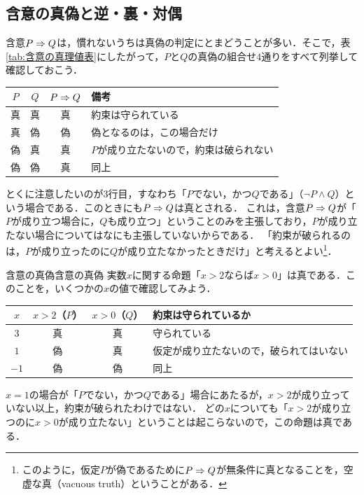 \subsection{含意の真偽と逆・裏・対偶}

含意$P \mathrel{\Rightarrow} Q$は，慣れないうちは真偽の判定にとまどうことが多い．そこで，表\ref{tab:含意の真理値表}にしたがって，$P$と$Q$の真偽の組合せ$4$通りをすべて列挙して確認しておこう．

\begin{center}
  \begin{tabular}{|c|c|c|l|} \hline
    $P$ & $Q$ & $P \mathrel{\Rightarrow} Q$ & 備考                                   \\ \hline
    真  & 真  & 真          & 約束は守られている                     \\ \hline
    真  & 偽  & 偽 & 偽となるのは，この場合だけ    \\ \hline
    偽  & 真  & 真          & $P$が成り立たないので，約束は破られない \\ \hline
    偽  & 偽  & 真          & 同上                                   \\ \hline
  \end{tabular}
\end{center}

とくに注意したいのが3行目，すなわち「$P$でない，かつ$Q$である」（$\lnot P \land Q$）という場合である．このときにも$P \mathrel{\Rightarrow} Q$は真とされる．
これは，含意$P \mathrel{\Rightarrow} Q$が「$P$が成り立つ場合に，$Q$も成り立つ」ということのみを主張しており，$P$が成り立たない場合についてはなにも主張していないからである．
「約束が破られるのは，$P$が成り立ったのに$Q$が成り立たなかったときだけ」と考えるとよい\footnote{このように，仮定$P$が偽であるために$P \mathrel{\Rightarrow} Q$が無条件に真となることを，空虚な真（vacuous truth）ということがある．}．

\begin{example}{含意の真偽}{含意の真偽}
  実数$x$に関する命題「$x > 2$ならば$x > 0$」は真である．このことを，いくつかの$x$の値で確認してみよう．
  \begin{center}
    \begin{tabular}{|c|c|c|l|} \hline
      $x$  & $x > 2$（$P$） & $x > 0$（$Q$） & 約束は守られているか                     \\ \hline
      $3$  & 真             & 真             & 守られている                             \\ \hline
      $1$  & 偽             & 真             & 仮定が成り立たないので，破られてはいない \\ \hline
      $-1$ & 偽             & 偽             & 同上                                     \\ \hline
    \end{tabular}
  \end{center}
  $x = 1$の場合が「$P$でない，かつ$Q$である」場合にあたるが，$x > 2$が成り立っていない以上，約束が破られたわけではない．
  どの$x$についても「$x>2$が成り立つのに$x>0$が成り立たない」ということは起こらないので，この命題は真である．
\end{example}

